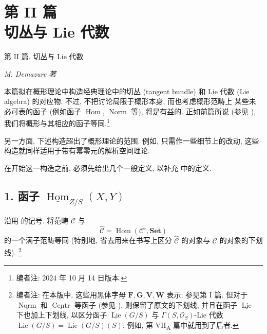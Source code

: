 
\setcounter{footnote}{-1}
\chapter*{第 II 篇\\切丛与 Lie 代数}
%
  {第 II 篇. 切丛与 Lie 代数}

\begin{center}
  \textit{M. Demazure 著}
\end{center}

本篇拟在概形理论中构造经典理论中的切丛 (tangent bundle) 和 Lie 代数
(Lie algebra) 的对应物. 不过, 不把讨论局限于概形本身, 而也考虑概形范畴上
某些未必可表的函子 (例如函子
\(\underline{\operatorname{Hom}}\), \(\underline{\operatorname{Norm}}\)
等), 将是有益的. 正如前篇所说 (参见 ),
我们将概形与其相应的函子等同.\footnote{编者注:
2024 年 10 月 14 日版本.}

另一方面, 下述构造超出了概形理论的范围. 例如, 只需作一些细节上的改动,
这些构造就同样适用于带有幂零元的解析空间理论.

在开始这一构造之前, 必须先给出几个一般定义, 以补充
 中的定义.

\section*{1. 函子
  \(\underline{\operatorname{Hom}}_{Z/S}(X,Y)\)}

沿用  的记号. 将范畴 \(\mathscr C\)
与
\[
  \widehat{\mathscr C}
  =\operatorname{Hom}(\mathscr C^{\circ},\mathbf{Set})
\]
的一个满子范畴等同 (特别地, 省去用来在书写上区分
\(\widehat{\mathscr C}\) 的对象与 \(\mathscr C\) 的对象的下划线).
\footnote{编者注: 在本版中, 这些用黑体字母
\(\mathbf F,\mathbf G,\mathbf V,\mathbf W\) 表示; 参见第 I 篇.
但对于 \(\underline{\operatorname{Norm}}\) 和
\(\underline{\operatorname{Centr}}\) 等函子 (参见
), 则保留了原文的下划线,
并且在函子 \(\underline{\operatorname{Lie}}\) 下也加上下划线,
以区分函子 \(\underline{\operatorname{Lie}}(G/S)\) 与
\(\Gamma(S,\mathcal O_S)\)-Lie 代数
\(\operatorname{Lie}(G/S)=\underline{\operatorname{Lie}}(G/S)(S)\);
例如, 第 VII\textsubscript{A} 篇中就用到了后者.}

